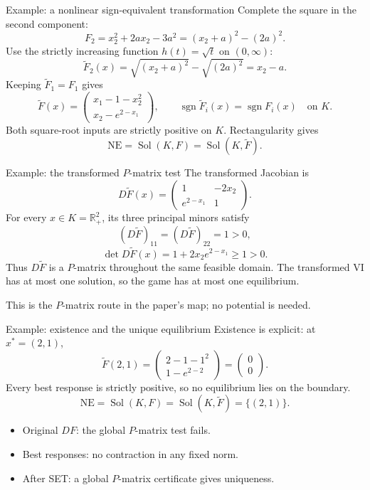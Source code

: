 \documentclass[11pt,aspectratio=169]{beamer}
\theoremstyle{plain}
\theoremstyle{definition}
\DeclareMathOperator{\sgn}{sgn}
\DeclareMathOperator{\Sol}{Sol}
\newcommand{\compactmath}{%
 \setlength{\abovedisplayskip}{4pt}\setlength{\belowdisplayskip}{4pt}%
 \setlength{\abovedisplayshortskip}{2pt}\setlength{\belowdisplayshortskip}{4pt}}
\begin{document}
\begin{frame}{Example: a nonlinear sign-equivalent transformation}
\compactmath
Complete the square in the second component:
\[
 F_2=x_2^2+2a x_2-3a^2=(x_2+a)^2-(2a)^2.
\]
Use the strictly increasing function $h(t)=\sqrt t$ on $(0,\infty)$:
\[
 \widetilde F_2(x)
 =\sqrt{(x_2+a)^2}-\sqrt{(2a)^2}=x_2-a.
\]
Keeping $\widetilde F_1=F_1$ gives
\[
 \widetilde F(x)=\begin{pmatrix}
 x_1-1-x_2^2\\x_2-e^{2-x_1}
 \end{pmatrix},\qquad
 \sgn\widetilde F_i(x)=\sgn F_i(x)\quad\text{on }K.
\]
Both square-root inputs are strictly positive on $K$. Rectangularity gives
\[
 \mathrm{NE}=\Sol(K,F)=\Sol(K,\widetilde F).
\]
\end{frame}


\begin{frame}{Example: the transformed $P$-matrix test}
\compactmath
The transformed Jacobian is
\[
 D\widetilde F(x)=\begin{pmatrix}
 1&-2x_2\\e^{2-x_1}&1
 \end{pmatrix}.
\]
For every $x\in K=\mathbb R_+^2$, its three principal minors satisfy
\[
 (D\widetilde F)_{11}=(D\widetilde F)_{22}=1>0,
\]
\[
 \det D\widetilde F(x)=1+2x_2e^{2-x_1}\geq1>0.
\]
Thus $D\widetilde F$ is a $P$-matrix throughout the same feasible domain.
The transformed VI has \alert{at most one} solution, so the game has at most one equilibrium.
\medskip\par
This is the $P$-matrix route in the paper's map; no potential is needed.
\end{frame}


\begin{frame}{Example: existence and the unique equilibrium}
\compactmath
Existence is explicit: at $x^*=(2,1)$,
\[
 \widetilde F(2,1)=\begin{pmatrix}2-1-1^2\\1-e^{2-2}\end{pmatrix}
 =\begin{pmatrix}0\\0\end{pmatrix}.
\]
Every best response is strictly positive, so no equilibrium lies on the boundary.
\[
 \boxed{\mathrm{NE}=\Sol(K,F)=\Sol(K,\widetilde F)=\{(2,1)\}.}
\]
\medskip
\begin{itemize}
 \item Original $DF$: the global $P$-matrix test fails.
 \item Best responses: no contraction in any fixed norm.
 \item After SET: a global $P$-matrix certificate gives uniqueness.
\end{itemize}
\end{frame}
\end{document}

